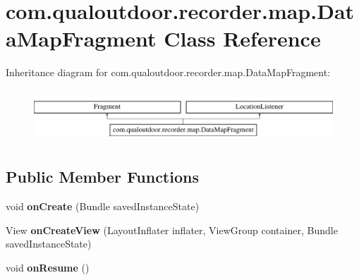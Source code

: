 \hypertarget{classcom_1_1qualoutdoor_1_1recorder_1_1map_1_1DataMapFragment}{\section{com.\-qualoutdoor.\-recorder.\-map.\-Data\-Map\-Fragment Class Reference}
\label{classcom_1_1qualoutdoor_1_1recorder_1_1map_1_1DataMapFragment}
}
Inheritance diagram for com.\-qualoutdoor.\-recorder.\-map.\-Data\-Map\-Fragment\-:\begin{figure}[H]
\begin{center}
\leavevmode
\includegraphics[height=2.000000cm]{classcom_1_1qualoutdoor_1_1recorder_1_1map_1_1DataMapFragment}
\end{center}
\end{figure}
\subsection*{Public Member Functions}
\begin{DoxyCompactItemize}
\item 
\hypertarget{classcom_1_1qualoutdoor_1_1recorder_1_1map_1_1DataMapFragment_a7b25f2611914b58fc774da31c4a22cbe}{void {\bfseries on\-Create} (Bundle saved\-Instance\-State)}\label{classcom_1_1qualoutdoor_1_1recorder_1_1map_1_1DataMapFragment_a7b25f2611914b58fc774da31c4a22cbe}

\item 
\hypertarget{classcom_1_1qualoutdoor_1_1recorder_1_1map_1_1DataMapFragment_a071cc429cc5e4bef51a728d3ca4dd1d6}{View {\bfseries on\-Create\-View} (Layout\-Inflater inflater, View\-Group container, Bundle saved\-Instance\-State)}\label{classcom_1_1qualoutdoor_1_1recorder_1_1map_1_1DataMapFragment_a071cc429cc5e4bef51a728d3ca4dd1d6}

\item 
\hypertarget{classcom_1_1qualoutdoor_1_1recorder_1_1map_1_1DataMapFragment_a8f9cf3ebd5f2943859294136dc013057}{void {\bfseries on\-Resume} ()}\label{classcom_1_1qualoutdoor_1_1recorder_1_1map_1_1DataMapFragment_a8f9cf3ebd5f2943859294136dc013057}

\end{DoxyCompactItemize}
